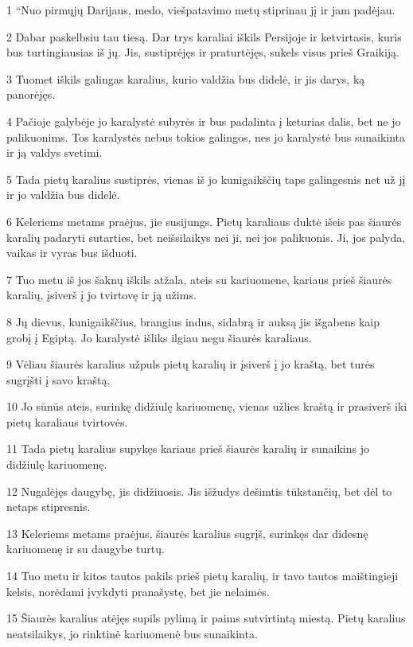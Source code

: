 \par 1 “Nuo pirmųjų Darijaus, medo, viešpatavimo metų stiprinau jį ir jam padėjau. 
\par 2 Dabar paskelbsiu tau tiesą. Dar trys karaliai iškils Persijoje ir ketvirtasis, kuris bus turtingiausias iš jų. Jis, sustiprėjęs ir praturtėjęs, sukels visus prieš Graikiją. 
\par 3 Tuomet iškils galingas karalius, kurio valdžia bus didelė, ir jis darys, ką panorėjęs. 
\par 4 Pačioje galybėje jo karalystė subyrės ir bus padalinta į keturias dalis, bet ne jo palikuonims. Tos karalystės nebus tokios galingos, nes jo karalystė bus sunaikinta ir ją valdys svetimi. 
\par 5 Tada pietų karalius sustiprės, vienas iš jo kunigaikščių taps galingesnis net už jį ir jo valdžia bus didelė. 
\par 6 Keleriems metams praėjus, jie susijungs. Pietų karaliaus duktė išeis pas šiaurės karalių padaryti sutarties, bet neišsilaikys nei ji, nei jos palikuonis. Ji, jos palyda, vaikas ir vyras bus išduoti. 
\par 7 Tuo metu iš jos šaknų iškils atžala, ateis su kariuomene, kariaus prieš šiaurės karalių, įsiverš į jo tvirtovę ir ją užims. 
\par 8 Jų dievus, kunigaikščius, brangius indus, sidabrą ir auksą jis išgabens kaip grobį į Egiptą. Jo karalystė išliks ilgiau negu šiaurės karaliaus. 
\par 9 Vėliau šiaurės karalius užpuls pietų karalių ir įsiverš į jo kraštą, bet turės sugrįšti į savo kraštą. 
\par 10 Jo sūnūs ateis, surinkę didžiulę kariuomenę, vienas užlies kraštą ir prasiverš iki pietų karaliaus tvirtovės. 
\par 11 Tada pietų karalius supykęs kariaus prieš šiaurės karalių ir sunaikins jo didžiulę kariuomenę. 
\par 12 Nugalėjęs daugybę, jis didžiuosis. Jis išžudys dešimtis tūkstančių, bet dėl to netaps stipresnis. 
\par 13 Keleriems metams praėjus, šiaurės karalius sugrįš, surinkęs dar didesnę kariuomenę ir su daugybe turtų. 
\par 14 Tuo metu ir kitos tautos pakils prieš pietų karalių, ir tavo tautos maištingieji kelsis, norėdami įvykdyti pranašystę, bet jie nelaimės. 
\par 15 Šiaurės karalius atėjęs supils pylimą ir paims sutvirtintą miestą. Pietų karalius neatsilaikys, jo rinktinė kariuomenė bus sunaikinta. 
